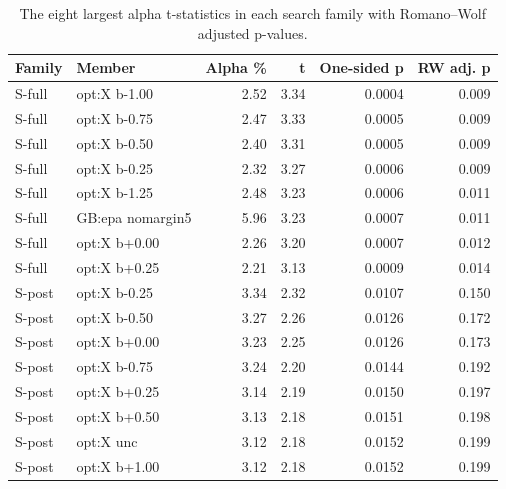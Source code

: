 \begin{table}[htbp]
\centering
\footnotesize
\caption{The eight largest alpha t-statistics in each search family with Romano--Wolf adjusted p-values.}
\label{tab:m7_search_top}
\begin{tabular}{llrrrr}
\toprule
Family & Member & Alpha \% & t & One-sided p & RW adj. p \\
\midrule
S-full & opt:X b-1.00 & 2.52 & 3.34 & 0.0004 & 0.009 \\
S-full & opt:X b-0.75 & 2.47 & 3.33 & 0.0005 & 0.009 \\
S-full & opt:X b-0.50 & 2.40 & 3.31 & 0.0005 & 0.009 \\
S-full & opt:X b-0.25 & 2.32 & 3.27 & 0.0006 & 0.009 \\
S-full & opt:X b-1.25 & 2.48 & 3.23 & 0.0006 & 0.011 \\
S-full & GB:epa nomargin5 & 5.96 & 3.23 & 0.0007 & 0.011 \\
S-full & opt:X b+0.00 & 2.26 & 3.20 & 0.0007 & 0.012 \\
S-full & opt:X b+0.25 & 2.21 & 3.13 & 0.0009 & 0.014 \\
S-post & opt:X b-0.25 & 3.34 & 2.32 & 0.0107 & 0.150 \\
S-post & opt:X b-0.50 & 3.27 & 2.26 & 0.0126 & 0.172 \\
S-post & opt:X b+0.00 & 3.23 & 2.25 & 0.0126 & 0.173 \\
S-post & opt:X b-0.75 & 3.24 & 2.20 & 0.0144 & 0.192 \\
S-post & opt:X b+0.25 & 3.14 & 2.19 & 0.0150 & 0.197 \\
S-post & opt:X b+0.50 & 3.13 & 2.18 & 0.0151 & 0.198 \\
S-post & opt:X unc & 3.12 & 2.18 & 0.0152 & 0.199 \\
S-post & opt:X b+1.00 & 3.12 & 2.18 & 0.0152 & 0.199 \\
\bottomrule
\end{tabular}
\end{table}
